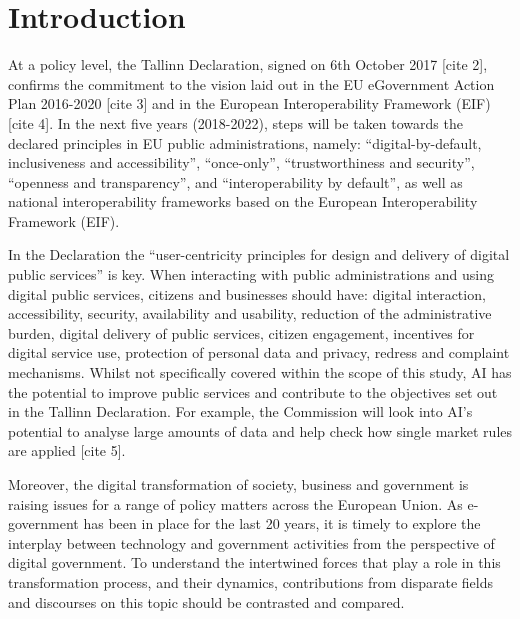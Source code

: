 
\chapter{Introduction}  %

\ifpdf
    \graphicspath{{Chapter1/Figs/Raster/}{Chapter1/Figs/PDF/}{Chapter1/Figs/}}
\else
    \graphicspath{{Chapter1/Figs/Vector/}{Chapter1/Figs/}}
\fi

At a policy level, the Tallinn Declaration, signed on 6th October 2017 [cite 2],
confirms the commitment to the vision laid out in the EU eGovernment Action Plan
2016-2020 [cite 3] and in the European Interoperability Framework (EIF) [cite 4].
In the next five years (2018-2022), steps will be taken towards the declared
principles in EU public administrations, namely: “digital-by-default, inclusiveness
and accessibility”, “once-only”, “trustworthiness and security”, “openness and
transparency”, and “interoperability by default”, as well as national interoperability
frameworks based on the European Interoperability Framework (EIF).

In the Declaration the “user-centricity principles for design and delivery of
digital public services” is key. When interacting with public administrations and
using digital public services, citizens and businesses should have: digital
interaction, accessibility, security, availability and usability, reduction of the
administrative burden, digital delivery of public services, citizen engagement,
incentives for digital service use, protection of personal data and privacy, redress
and complaint mechanisms. Whilst not specifically covered within the scope of this
study, AI has the potential to improve public services and contribute to the
objectives set out in the Tallinn Declaration. For example, the Commission will look
into AI's potential to analyse large amounts of data and help check how single market
rules are applied [cite 5].

Moreover, the digital transformation of society, business and government is raising
issues for a range of policy matters across the European Union. As e-government has
been in place for the last 20 years, it is timely to explore the interplay between
technology and government activities from the perspective of digital government.
To understand the intertwined forces that play a role in this transformation process,
and their dynamics, contributions from disparate fields and discourses on this topic
should be contrasted and compared.


